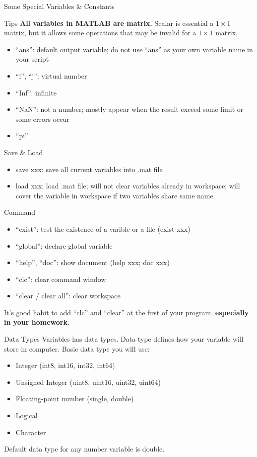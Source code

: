 \begin{frame}{Some Special Variables \& Constants}
\begin{block}{Tips}
\textbf{All variables in MATLAB are matrix.} Scalar is essential a $1\times1$ matrix, but it allows some operations that may be invalid for a $1\times1$ matrix.
\end{block}
\begin{itemize}
\item ``ans'': default output variable; do not use ``ans'' as your own variable name in your script
\item ``i'', ``j'': virtual number
\item ``Inf'': infinite
\item ``NaN'': not a number; mostly appear when the result exceed some limit or some errors occur
\item ``pi''
\end{itemize}

\begin{block}{Save \& Load}
\begin{itemize}
\item save xxx: save all current variables into .mat file
\item load xxx: load .mat file; will not clear variables already in workspace; will cover the variable in workspace if two variables share same name
\end{itemize}
\end{block}
\end{frame}

\begin{frame}{Command}
\begin{itemize}
\item ``exist'': test the existence of a varible or a file (exist xxx)
\item ``global'': declare global variable
\item ``help'', ``doc'': show document (help xxx; doc xxx)
\item ``clc'': clear command window
\item ``clear / clear all'': clear workspace
\end{itemize}
It's good habit to add ``clc'' and ``clear'' at the first of your program, \textbf{especially in your homework}.
\end{frame}

\begin{frame}{Data Types}
Variables has data types. Data type defines how your variable will store in computer. Basic data type you will use: 
\begin{itemize}
\item Integer (int8, int16, int32, int64)
\item Unsigned Integer (uint8, uint16, uint32, uint64)
\item Floating-point number (single, double)
\item Logical
\item Character
\end{itemize}
Default data type for any number variable is double.
\end{frame}

